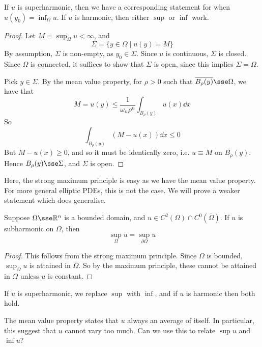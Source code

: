\documentclass{article}
\begin{document}
\begin{remark}
    If \(u\) is superharmonic, then we have a corresponding statement for when \(u(y_0) = \inf_\Omega u\). If \(u\) is harmonic, then either \(\sup\) or \(\inf\) work.
\end{remark}

\begin{proof}
    Let \(M = \sup_\Omega u < \infty\), and
    \[\Sigma = \{y \in \Omega \mid u(y) = M\}\]
    By assumption, \(\Sigma\) is non-empty, as \(y_0 \in \Sigma\). Since \(u\) is continuous, \(\Sigma\) is closed. Since \(\Omega\) is connected, it suffices to show that \(\Sigma\) is open, since this implies \(\Sigma = \Omega\).

    Pick \(y \in \Sigma\). By the mean value property, for \(\rho > 0\) such that \(\overline{B_\rho(y)} \sse \Omega\), we have that
    \[M = u(y) \le \frac{1}{\omega_n\rho^n}\int_{B_\rho(y)}u(x)\dd x\]
    So
    \[\int_{B_\rho(y)}(M - u(x))\dd x \le 0\]
    But \(M - u(x) \ge 0\), and so it must be identically zero, i.e. \(u \equiv M\) on \(B_\rho(y)\). Hence \(B_\rho(y) \sse \Sigma\), and \(\Sigma\) is open.
\end{proof}

Here, the strong maximum principle is easy as we have the mean value property. For more general elliptic PDEs, this is not the case. We will prove a weaker statement which does generalise.

\begin{theorem}
     Suppose \(\Omega \sse \R^n\) is a bounded domain, and \(u \in C^2(\Omega) \cap C^0(\overline{\Omega})\). If \(u\) is subharmonic on \(\Omega\), then
    \[\sup_\Omega u = \sup_{\partial\Omega} u\]
\end{theorem}

\begin{proof}
    This follows from the strong maximum principle. Since \(\Omega\) is bounded, \(\sup_\Omega u\) is attained in \(\overline\Omega\). So by the maximum principle, these cannot be attained in \(\Omega\) unless \(u\) is constant.
\end{proof}

\begin{remark}
    If \(u\) is superharmonic, we replace \(\sup\) with \(\inf\), and if \(u\) is harmonic then both hold.
\end{remark}

The mean value property states that \(u\) always an average of itself. In particular, this suggest that \(u\) cannot vary too much. Can we use this to relate \(\sup u\) and \(\inf u\)?
\end{document}

